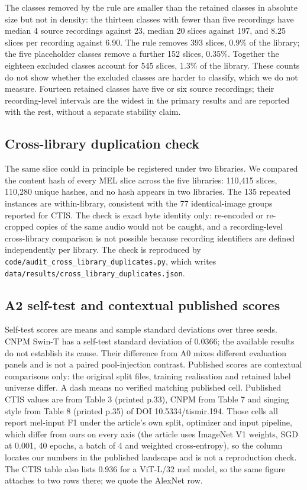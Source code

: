 The classes removed by the rule are smaller than the retained classes in absolute size but not
in density: the thirteen classes with fewer than five recordings have median 4 source
recordings against 23, median 20 slices against 197, and 8.25 slices per recording against 6.90.
The rule removes 393 slices, 0.9\% of the library; the five placeholder classes remove a
further 152 slices, 0.35\%. Together the eighteen excluded classes account for 545 slices,
1.3\% of the library. These counts do not show whether the excluded classes are harder to
classify, which we do not measure.
Fourteen retained classes have five or six source recordings; their recording-level intervals
are the widest in the primary results and are reported with the rest, without a separate
stability claim.

\subsection{Cross-library duplication check}

The same slice could in principle be registered under two libraries. We compared the content
hash of every MEL slice across the five libraries: 110{,}415 slices, 110{,}280 unique hashes,
and no hash appears in two libraries. The 135 repeated instances are within-library, consistent
with the 77 identical-image groups reported for CTIS. The check is exact byte identity only:
re-encoded or re-cropped copies of the same audio would not be caught, and a recording-level
cross-library comparison is not possible because recording identifiers are defined independently
per library. The check is reproduced by \texttt{code/audit\_cross\_library\_duplicates.py},
which writes \texttt{data/results/cross\_library\_duplicates.json}.

\subsection{A2 self-test and contextual published scores}

Self-test scores are means and sample standard deviations over three seeds. CNPM Swin-T has a self-test standard deviation of 0.0366; the available results do not establish its cause. Their difference from A0 mixes different evaluation panels and is not a paired pool-injection contrast. Published scores are contextual comparisons only: the original split files, training realisation and retained label universe differ. A dash means no verified matching published cell. Published CTIS values are from Table 3 (printed p.33), CNPM from Table 7 and singing style from Table 8 (printed p.35) of DOI 10.5334/tismir.194. Those cells all report mel-input F1 under the article's own split, optimizer and input pipeline, which differ from ours on every axis (the article uses ImageNet V1 weights, SGD at 0.001, 40 epochs, a batch of 4 and weighted cross-entropy), so the column locates our numbers in the published landscape and is not a reproduction check. The CTIS table also lists 0.936 for a ViT-L/32 mel model, so the same figure attaches to two rows there; we quote the AlexNet row.

